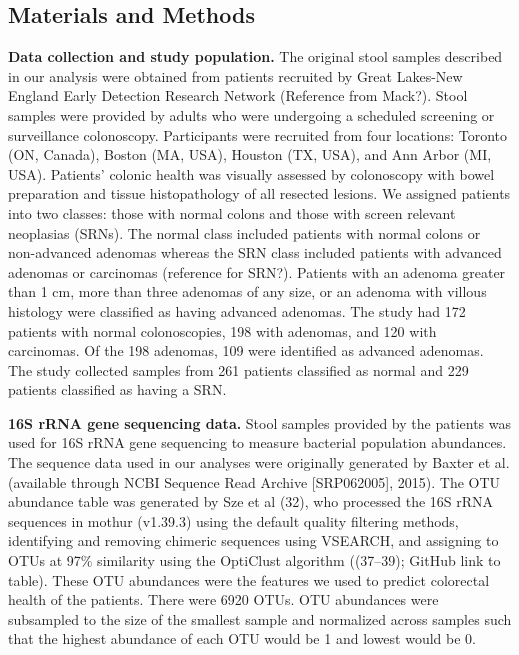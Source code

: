 \documentclass[11pt,]{article}
\begin{document}
\subsection{Materials and Methods}\label{materials-and-methods}

\textbf{Data collection and study population.} The original stool
samples described in our analysis were obtained from patients recruited
by Great Lakes-New England Early Detection Research Network (Reference
from Mack?). Stool samples were provided by adults who were undergoing a
scheduled screening or surveillance colonoscopy. Participants were
recruited from four locations: Toronto (ON, Canada), Boston (MA, USA),
Houston (TX, USA), and Ann Arbor (MI, USA). Patients' colonic health was
visually assessed by colonoscopy with bowel preparation and tissue
histopathology of all resected lesions. We assigned patients into two
classes: those with normal colons and those with screen relevant
neoplasias (SRNs). The normal class included patients with normal colons
or non-advanced adenomas whereas the SRN class included patients with
advanced adenomas or carcinomas (reference for SRN?). Patients with an
adenoma greater than 1 cm, more than three adenomas of any size, or an
adenoma with villous histology were classified as having advanced
adenomas. The study had 172 patients with normal colonoscopies, 198 with
adenomas, and 120 with carcinomas. Of the 198 adenomas, 109 were
identified as advanced adenomas. The study collected samples from 261
patients classified as normal and 229 patients classified as having a
SRN.

\textbf{16S rRNA gene sequencing data.} Stool samples provided by the
patients was used for 16S rRNA gene sequencing to measure bacterial
population abundances. The sequence data used in our analyses were
originally generated by Baxter et al. (available through NCBI Sequence
Read Archive {[}SRP062005{]}, 2015). The OTU abundance table was
generated by Sze et al (32), who processed the 16S rRNA sequences in
mothur (v1.39.3) using the default quality filtering methods,
identifying and removing chimeric sequences using VSEARCH, and assigning
to OTUs at 97\% similarity using the OptiClust algorithm ((37--39);
GitHub link to table). These OTU abundances were the features we used to
predict colorectal health of the patients. There were 6920 OTUs. OTU
abundances were subsampled to the size of the smallest sample and
normalized across samples such that the highest abundance of each OTU
would be 1 and lowest would be 0.
\end{document}
